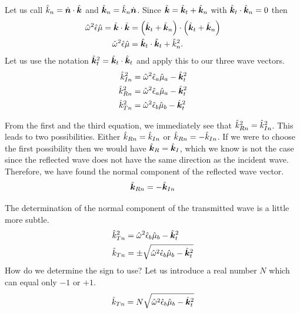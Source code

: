 Let us call $\hat{k}_n=\dot{\bm{n}} \cdot \hat{\bm{k}}$ and $\hat{\bm{k}}_n = \hat{k}_n \dot{\bm{n}}$.
Since $\hat{\bm{k}} = \hat{\bm{k}}_t + \hat{\bm{k}}_n$ with $\hat{\bm{k}}_t \cdot \hat{\bm{k}}_n=0$ then
\begin{subequations}
    \begin{align}
        \cp{\omega}^2 \cp{\epsilon} \cp{\mu}
        =
        \vectcp{k} \cdot \vectcp{k}
        &=
        \left( \vectcp{k}_t + \vectcp{k}_n \right) \cdot \left( \vectcp{k}_t + \vectcp{k}_n \right)
        \\
        \cp{\omega}^2 \cp{\epsilon} \cp{\mu}
        &=
        \vectcp{k}_t \cdot \vectcp{k}_t + \cp{k}_n^2
        \text{.}
    \end{align}
\end{subequations}
Let us use the notation $\hat{\bm{k}}_t^2 = \hat{\bm{k}}_t \cdot \hat{\bm{k}}_t$ and apply this to our three wave vectors.
\begin{align}
    \hat{k}_{I n}^2 &= \hat{\omega}^2 \hat{\epsilon}_a \hat{\mu}_a - \hat{\bm{k}}_t^2 \\
    \hat{k}_{R n}^2 &= \hat{\omega}^2 \hat{\epsilon}_a \hat{\mu}_a - \hat{\bm{k}}_t^2 \\
    \hat{k}_{T n}^2 &= \hat{\omega}^2 \hat{\epsilon}_b \hat{\mu}_b - \hat{\bm{k}}_t^2
\end{align}

From the first and the third equation, we immediately see that
$\hat{k}_{R n}^2 = \hat{k}_{I n}^2$.
This leads to two possibilities.
Either $\hat{k}_{R n} = \hat{k}_{I n}$ or $\hat{k}_{R n} = -\hat{k}_{I n}$.
If we were to choose the first possibility then we would have $\hat{\bm{k}}_R = \hat{\bm{k}}_I$, which we know is not the case since the reflected wave does not have the same direction as the incident wave.
Therefore, we have found the normal component of the reflected wave vector.
\begin{equation}
    \hat{\bm{k}}_{R n} = -\hat{\bm{k}}_{I n}
\end{equation}

The determination of the normal component of the transmitted wave is a little more subtle.
\begin{subequations}
    \label{eq:wavevector_reflected}
    \begin{align}
        \hat{k}_{T n}^2
        &=
        \hat{\omega}^2 \hat{\epsilon}_b \hat{\mu}_b - \hat{\bm{k}}_t^2
        \\
        \hat{k}_{T n}
        &=
        \pm
        \sqrt{
            \hat{\omega}^2 \hat{\epsilon}_b \hat{\mu}_b - \hat{\bm{k}}_t^2
        }
    \end{align}
\end{subequations}
How do we determine the sign to use?
Let us introduce a real number $N$ which can equal only $-1$ or $+1$.
\begin{equation}
    \hat{k}_{T n} = N \sqrt{\hat{\omega}^2 \hat{\epsilon}_b \hat{\mu}_b - \hat{\bm{k}}_t^2}
\end{equation}

